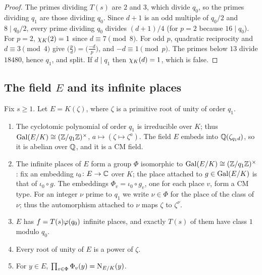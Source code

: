 \begin{proof}
The primes dividing $T(s)$ are $2$ and $3$, which divide $q_0$, so the primes dividing $q_1$ are those
dividing $q_0$. Since $d+1$ is an odd multiple of $q_0/2$ and $8\mid q_0/2$, every prime dividing
$q_0$ divides $(d+1)/4$ (for $p=2$ because $16\mid q_0$). For $p=2$, $\chi_K(2)=1$ since
$d\equiv7\pmod8$. For odd $p$, quadratic reciprocity and $d\equiv3\pmod4$ give
$\bigl(\frac pd\bigr)=\bigl(\frac{-d}{p}\bigr)$, and $-d\equiv1\pmod p$. The primes below $13$ divide
$18480$, hence $q_1$, and split. If $d\mid q_1$ then $\chi_K(d)=1$, which is false.
\end{proof}

\subsection{The field \texorpdfstring{$E$}{E} and its infinite places}\label{ss:field-E}
Fix $s\ge1$. Let $E=K(\zeta)$, where $\zeta$ is a primitive root of unity of order $q_1$.

\begin{proposition}\label{prop:field-E}
\begin{enumerate}[label=\textup{(\alph*)}]
\item The cyclotomic polynomial of order $q_1$ is irreducible over $K$; thus
$\operatorname{Gal}(E/K)\cong(\mathbb{Z}/q_1\mathbb{Z})^\times$, $a\mapsto(\zeta\mapsto\zeta^a)$. The field $E$ embeds into
$\mathbb{Q}(\zeta_{q_1d})$, so it is abelian over $\mathbb{Q}$, and it is a CM field.
\item The infinite places of $E$ form a group $\Phi$ isomorphic to $\operatorname{Gal}(E/K)\cong(\mathbb{Z}/q_1\mathbb{Z})^\times$:
fix an embedding $\iota_0\colon E\to\mathbb{C}$ over $K$; the place attached to $g\in\operatorname{Gal}(E/K)$ is that of
$\iota_0\circ g$. The embeddings $\Phi_v=\iota_0\circ g_v$, one for each place $v$, form a CM type.
For an integer $\nu$ prime to $q_1$ we write $\nu\in\Phi$ for the place of the class of $\nu$; thus the
automorphism attached to $\nu$ maps $\zeta$ to $\zeta^\nu$.
\item $E$ has $f=T(s)\varphi(q_0)$ infinite places, and exactly $T(s)$ of them have class $1$ modulo
$q_0$.
\item Every root of unity of $E$ is a power of $\zeta$.
\item For $y\in E$, $\prod_{v\in\Phi}\Phi_v(y)=\operatorname{N}_{E/K}(y)$.
\end{enumerate}
\end{proposition}

